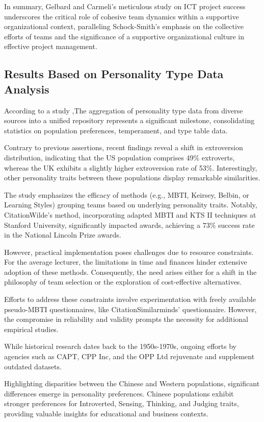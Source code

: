 \documentclass[runningheads]{llncs}
\begin{document}
In summary, Gelbard and Carmeli's meticulous study on ICT project success underscores the critical role of cohesive team dynamics within a supportive organizational context, paralleling Schock-Smith's emphasis on the collective efforts of teams and the significance of a supportive organizational culture in effective project management.

\subsection{Results Based on Personality Type Data Analysis}
According to a study \cite{ref_6} ,The aggregation of personality type data from diverse sources into a unified repository represents a significant milestone, consolidating statistics on population preferences, temperament, and type table data.

Contrary to previous assertions, recent findings reveal a shift in extroversion distribution, indicating that the US population comprises 49\% extroverts, whereas the UK exhibits a slightly higher extroversion rate of 53\%. Interestingly, other personality traits between these populations display remarkable similarities.

The study emphasizes the efficacy of methods (e.g., MBTI, Keirsey, Belbin, or Learning Styles) grouping teams based on underlying personality traits. Notably, CitationWilde's method, incorporating adapted MBTI and KTS II techniques at Stanford University, significantly impacted awards, achieving a 73\% success rate in the National Lincoln Prize awards.

However, practical implementation poses challenges due to resource constraints. For the average lecturer, the limitations in time and finances hinder extensive adoption of these methods. Consequently, the need arises either for a shift in the philosophy of team selection or the exploration of cost-effective alternatives.

Efforts to address these constraints involve experimentation with freely available pseudo-MBTI questionnaires, like CitationSimilarminds' questionnaire. However, the compromise in reliability and validity prompts the necessity for additional empirical studies.

While historical research dates back to the 1950s-1970s, ongoing efforts by agencies such as CAPT, CPP Inc, and the OPP Ltd rejuvenate and supplement outdated datasets.

Highlighting disparities between the Chinese and Western populations, significant differences emerge in personality preferences. Chinese populations exhibit stronger preferences for Introverted, Sensing, Thinking, and Judging traits, providing valuable insights for educational and business contexts.
\end{document}
